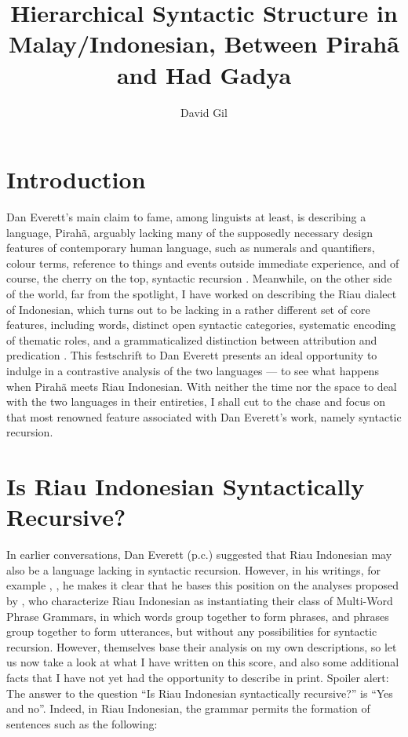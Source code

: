 \documentclass[output=paper,colorlinks,citecolor=brown
]{langscibook}
\author{David Gil\affiliation{Max Planck Institute for Evolutionary Anthropology}}
\title[Hierarchical Syntactic Structure in Malay/Indonesian]{Hierarchical Syntactic Structure in Malay/Indonesian,
Between Pirahã and Had Gadya}
\begin{document}
\maketitle


\section{Introduction}
Dan Everett's main claim to fame, among linguists at least, is describing a language, Pirahã, arguably lacking many of the supposedly necessary design features of contemporary human language, such as numerals and quantifiers, colour terms, reference to things and events outside immediate experience, and of course, the cherry on the top, syntactic recursion \citep{everett2005cultural}. Meanwhile, on the other side of the world, far from the spotlight, I have worked on describing the Riau dialect of Indonesian, which turns out to be lacking in a rather different set of core features, including words, distinct open syntactic categories, systematic encoding of thematic roles, and a grammaticalized distinction between attribution and predication \citep{gil2005word,gil2006intonation,gil2012predication,gil2013riau, gil2017isolating, gil2020isolating}. This festschrift to Dan Everett presents an ideal opportunity to indulge in a contrastive analysis of the two languages — to see what happens when Pirahã meets Riau Indonesian. With neither the time nor the space to deal with the two languages in their entireties, I shall cut to the chase and focus on that most renowned feature associated with Dan Everett's work, namely syntactic recursion.

\section{Is Riau Indonesian Syntactically Recursive?}
In earlier conversations, Dan Everett (p.c.) suggested that Riau Indonesian may also be a language lacking in syntactic recursion. However, in his writings, for example \citet{futrell2016corpus}, \citet{everett2017grammar}, he makes it clear that he bases this position on the analyses proposed by \citet{jackendoff2014syntax, jackendoff2017linear}, who characterize Riau Indonesian as instantiating their class of Multi-Word Phrase Grammars, in which words group together to form phrases, and phrases group together to form utterances, but without any possibilities for syntactic recursion. However, \cite{jackendoff2014syntax, jackendoff2017linear} themselves base their analysis on my own descriptions, so let us now take a look at what I have written on this score, and also some additional facts that I have not yet had the opportunity to describe in print. Spoiler alert: The answer to the question ``Is Riau Indonesian syntactically recursive?'' is ``Yes and no''.
Indeed, in Riau Indonesian, the grammar permits the formation of sentences such as the following:
\end{document}
